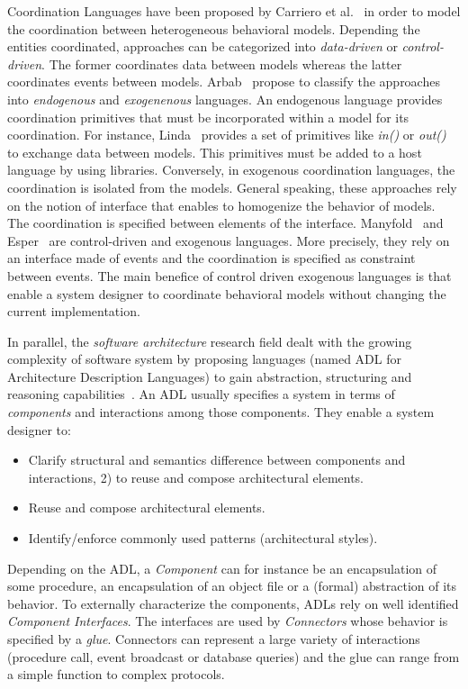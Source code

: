 Coordination Languages have been proposed by Carriero et al.~\cite{coordsignibib} in order to model the coordination between heterogeneous behavioral models. Depending the entities coordinated, approaches can be categorized into \emph{data-driven} or \emph{control-driven}. The former coordinates data between models whereas the latter coordinates events between models. Arbab~\cite{whatdocoord} propose to classify the approaches into \emph{endogenous} and \emph{exogenenous} languages. An endogenous language provides coordination primitives that must be incorporated within a model for its coordination. For instance, Linda~\cite{lindabib} provides a set of primitives like \emph{in()} or \emph{out()} to exchange data between models. This primitives must be added to a host language by using libraries. Conversely, in exogenous coordination languages, the coordination is isolated from the models. General speaking, these approaches rely on the notion of interface that enables to homogenize the behavior of models. The coordination is specified between elements of the interface. Manyfold~\cite{manifoldbib} and Esper~\cite{esperbib} are control-driven and exogenous languages. More precisely, they rely on an interface made of events and the coordination is specified as constraint between events. The main benefice of control driven exogenous languages is that enable a system designer to coordinate behavioral models without changing the current implementation.

In parallel, the \emph{software architecture} research field dealt with the growing complexity of software system by proposing languages (named ADL for Architecture Description Languages) to gain abstraction, structuring and reasoning capabilities~\cite{rapidebib,wrightbib,uniconbib,frameadlsbib,garlansoftarchbib}. An ADL usually specifies a system in terms of \emph{components} and interactions among those components. They enable a system designer to:
\begin{itemize}
	\item Clarify structural and semantics difference between components and interactions, 2) to reuse and compose architectural elements.
	\item Reuse and compose architectural elements.
	\item Identify/enforce commonly used patterns (\eg architectural styles).
\end{itemize}
Depending on the ADL, a \emph{Component} can for instance be an encapsulation of some procedure, an encapsulation of an object file or a (formal) abstraction of its behavior. To externally characterize the components, ADLs rely on well identified \emph{Component Interfaces}. The interfaces are used by \emph{Connectors} whose behavior is specified by a \emph{glue}. Connectors can represent a large variety of interactions (\eg procedure call, event broadcast or database queries) and the glue can range from a simple function to complex protocols. 


